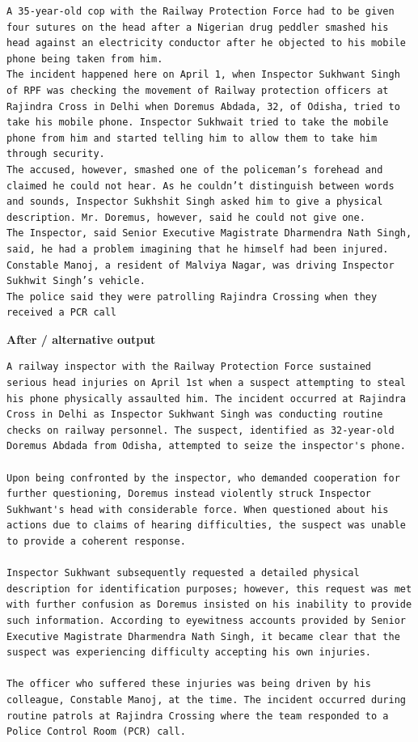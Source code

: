 \begin{Verbatim}
A 35-year-old cop with the Railway Protection Force had to be given four sutures on the head after a Nigerian drug peddler smashed his head against an electricity conductor after he objected to his mobile phone being taken from him.
The incident happened here on April 1, when Inspector Sukhwant Singh of RPF was checking the movement of Railway protection officers at Rajindra Cross in Delhi when Doremus Abdada, 32, of Odisha, tried to take his mobile phone. Inspector Sukhwait tried to take the mobile phone from him and started telling him to allow them to take him through security.
The accused, however, smashed one of the policeman’s forehead and claimed he could not hear. As he couldn’t distinguish between words and sounds, Inspector Sukhshit Singh asked him to give a physical description. Mr. Doremus, however, said he could not give one.
The Inspector, said Senior Executive Magistrate Dharmendra Nath Singh, said, he had a problem imagining that he himself had been injured. Constable Manoj, a resident of Malviya Nagar, was driving Inspector Sukhwit Singh’s vehicle.
The police said they were patrolling Rajindra Crossing when they received a PCR call
\end{Verbatim}

\textbf{After / alternative output}

\begin{Verbatim}
A railway inspector with the Railway Protection Force sustained serious head injuries on April 1st when a suspect attempting to steal his phone physically assaulted him. The incident occurred at Rajindra Cross in Delhi as Inspector Sukhwant Singh was conducting routine checks on railway personnel. The suspect, identified as 32-year-old Doremus Abdada from Odisha, attempted to seize the inspector's phone. 

Upon being confronted by the inspector, who demanded cooperation for further questioning, Doremus instead violently struck Inspector Sukhwant's head with considerable force. When questioned about his actions due to claims of hearing difficulties, the suspect was unable to provide a coherent response. 

Inspector Sukhwant subsequently requested a detailed physical description for identification purposes; however, this request was met with further confusion as Doremus insisted on his inability to provide such information. According to eyewitness accounts provided by Senior Executive Magistrate Dharmendra Nath Singh, it became clear that the suspect was experiencing difficulty accepting his own injuries.

The officer who suffered these injuries was being driven by his colleague, Constable Manoj, at the time. The incident occurred during routine patrols at Rajindra Crossing where the team responded to a Police Control Room (PCR) call.
\end{Verbatim}

